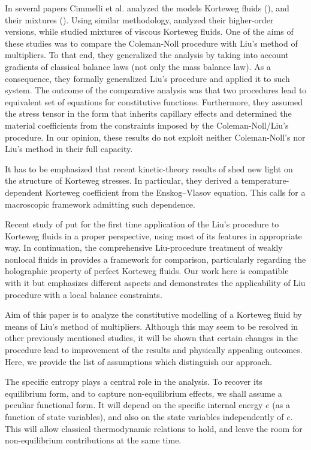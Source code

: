 \documentclass[a4paper,fleqn]{cas-sc}
\theoremstyle{definition}
\begin{document}
In several papers Cimmelli et al. analyzed the models Korteweg fluids (\cite{cimmelli2011thermodynamics}), and their mixtures (\cite{cimmelli2020weakly}). Using similar methodology, \cite{gorgone2021characterization} analyzed their higher-order versions, while \cite{gorgone2021thermodynamical} studied mixtures of viscous Korteweg fluids. One of the aims of these studies was to compare the Coleman-Noll procedure with Liu's method of multipliers. To that end, they generalized the analysis by taking into account gradients of classical balance laws (not only the mass balance law). As a consequence, they formally generalized Liu's procedure and applied it to such system. The outcome of the comparative analysis was that two procedures lead to equivalent set of equations for constitutive functions. Furthermore, they assumed the stress tensor in the form that inherits capillary effects and determined the material coefficients from the constraints imposed by the Coleman-Noll/Liu's procedure. In our opinion, these results do not exploit neither Coleman-Noll's nor Liu's method in their full capacity. 

It has to be emphasized that recent kinetic-theory results of \cite{bhattacharjee2024temperature} shed new light on the structure of Korteweg stresses. In particular, they derived a temperature-dependent Korteweg coefficient from the Enskog--Vlasov equation. This calls for a macroscopic framework admitting such dependence. 

Recent study of \cite{van2023holographic} put for the first time application of the Liu's procedure to Korteweg fluids in a proper perspective, using most of its features in appropriate way. In continuation, the comprehensive Liu-procedure treatment of weakly nonlocal fluids in \cite{szucs2025thermodynamic} provides a framework for comparison, particularly regarding the holographic property of perfect Korteweg fluids. Our work here is compatible with it but emphasizes different aspects and demonstrates the applicability of Liu procedure with a local balance constraints.

Aim of this paper is to analyze the constitutive modelling of a Korteweg fluid by means of Liu's method of multipliers. Although this may seem to be resolved in other previously mentioned studies, it will be shown that certain changes in the procedure lead to improvement of the results and physically appealing outcomes. Here, we provide the list of assumptions which distinguish our approach. 

The specific entropy plays a central role in the analysis. To recover its equilibrium form, and to capture non-equilibrium effects, we shall assume a peculiar functional form. It will depend on the specific internal energy $e$ (as a function of state variables), and also on the state variables independently of $e$. This will allow classical thermodynamic relations to hold, and leave the room for non-equilibrium contributions at the same time. 
\end{document}
